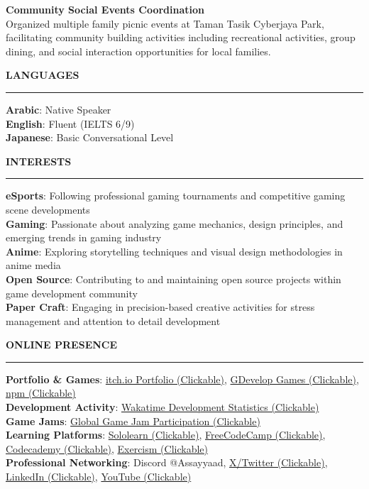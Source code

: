 \documentclass[a4paper,10pt]{article}
\newcommand{\sectionheading}[1]{%
  \addvspace{\medskipamount}%
  {\large\bfseries\MakeUppercase{#1}} %
  \noindent\rule{\linewidth}{0.4pt}%
  \vspace{\smallskipamount}%
}
\begin{document}
\addvspace{\smallskipamount}

\textbf{Community Social Events Coordination}\\
Organized multiple family picnic events at Taman Tasik Cyberjaya Park, facilitating community building activities including recreational activities, group dining, and social interaction opportunities for local families.

\sectionheading{Languages}
\textbf{Arabic}: Native Speaker\\
\textbf{English}: Fluent (IELTS 6/9)\\
\textbf{Japanese}: Basic Conversational Level

\sectionheading{Interests}
\textbf{eSports}: Following professional gaming tournaments and competitive gaming scene developments\\
\textbf{Gaming}: Passionate about analyzing game mechanics, design principles, and emerging trends in gaming industry\\
\textbf{Anime}: Exploring storytelling techniques and visual design methodologies in anime media\\
\textbf{Open Source}: Contributing to and maintaining open source projects within game development community\\
\textbf{Paper Craft}: Engaging in precision-based creative activities for stress management and attention to detail development

\sectionheading{Online Presence}
\textbf{Portfolio \& Games}: \href{https://assayyaad.itch.io}{itch.io Portfolio (Clickable)}, \href{https://gd.games/Assayyaad}{GDevelop Games (Clickable)}, \href{https://www.npmjs.com/~nabil_alsaiad}{npm (Clickable)}\\
\textbf{Development Activity}: \href{https://wakatime.com/@Assayyaad}{Wakatime Development Statistics (Clickable)}\\
\textbf{Game Jams}: \href{https://globalgamejam.org/users/assayyaad}{Global Game Jam Participation (Clickable)}\\
\textbf{Learning Platforms}: \href{https://www.sololearn.com/en/profile/17032869}{Sololearn (Clickable)}, \href{https://www.freecodecamp.org/Assayyaad}{FreeCodeCamp (Clickable)}, \href{https://www.codecademy.com/profiles/Assayyaad}{Codecademy (Clickable)}, \href{https://exercism.org/profiles/Assayyaad}{Exercism (Clickable)}\\
\textbf{Professional Networking}: Discord @Assayyaad, \href{https://x.com/Assayyaad}{X/Twitter (Clickable)}, \href{https://linkedin.com/in/Assayyaad}{LinkedIn (Clickable)}, \href{https://youtube.com/@Assayyaad}{YouTube (Clickable)}

\end{document}
